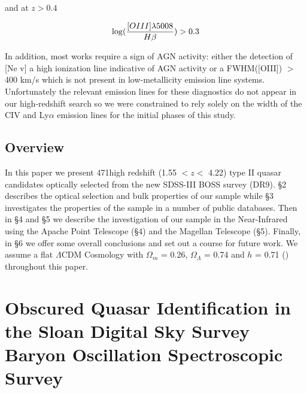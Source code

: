 \documentclass[preprint]{aastex}
\begin{document}
and at $z > 0.4$

\begin{equation}
\log({{[OIII] \lambda5008}\over{H\beta}}) >  0.3 
\label{eq:z2}
\end{equation}

In addition, most works \citep[for example see][]{2003AJ....126.2125Z} require a sign of AGN activity: either the detection of [Ne v] a high ionization line indicative of AGN activity or a FWHM([OIII]) $>$ 400 km/s which is not present in low-metallicity emission line systems.  Unfortunately the relevant emission lines for these diagnostics do not appear in our high-redshift search so we were constrained to rely solely on the width of the CIV and Ly$\alpha$ emission lines for  the initial phases of this study.  

\subsection{Overview}

In this paper we present 471high redshift (1.55 $< z <$ 4.22) type II quasar candidates optically selected from the new SDSS-III BOSS survey (DR9). \S 2 describes the optical selection and bulk properties of our sample while \S 3 investigates the properties of the sample in a number of public databases.  Then in \S4 and \S5 we describe the investigation of our sample in the Near-Infrared using the Apache Point Telescope (\S4) and the Magellan Telescope (\S5).  Finally, in \S6 we offer some overall conclusions and set out a course for future work.  We assume a flat $\Lambda$CDM Cosmology with $\Omega_m$ = 0.26, $\Omega_{\Lambda}$ = 0.74 and $h$ = 0.71 (\cite{2007ApJS..170..377S}) throughout this paper.         

\pagebreak

\section{Obscured Quasar Identification in the Sloan Digital Sky Survey Baryon Oscillation Spectroscopic Survey}
\end{document}
